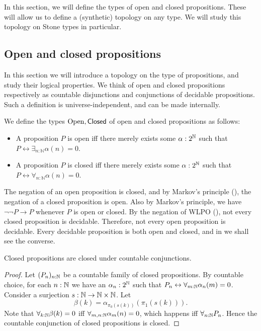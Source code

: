 In this section, we will define the types of open and closed propositions. 
These will allow us to define a (synthetic) topology  \cite{SyntheticTopologyLesnik} on any type.
We will study this topology on Stone types in particular.

\subsection{Open and closed propositions}
In this section we will introduce a topology on the type of propositions, and 
study their logical properties.
We think of open and closed propositions respectively as countable disjunctions and conjunctions of decidable propositions.
Such a definition is universe-independent, and can be made internally.

\begin{definition}
  We define the types $\mathrm{Open}, \mathsf{Closed}$ of open and closed propositions as follows:
  \begin{itemize}
    \item 
    A proposition $P$ is open iff there merely exists some $\alpha:2^{\mathbb{N}}$ such that 
      $P \leftrightarrow \exists_{n:\mathbb N} \alpha(n) = 0$. 
    \item 
    A proposition $P$ is closed iff there merely exists some $\alpha:2^{\mathbb{N}}$ such that 
      $P \leftrightarrow \forall_{n:\mathbb N} \alpha(n) = 0$. 
  \end{itemize}
\end{definition}

\begin{remark}\label{rmkOpenClosedNegation}
  The negation of an open proposition is closed, 
  and by Markov's principle (), the negation of a closed proposition is open. 
  Also by Markov's principle, we have $\neg \neg P \to P$ whenever $P$ is open or closed. 
  By the negation of WLPO (), 
  not every closed proposition is decidable. 
  Therefore, not every open proposition is decidable. 
  Every decidable proposition is both open and closed, 
  and in  we shall see the converse. 
\end{remark}

\begin{lemma}\label{ClosedCountableConjunction}
  Closed propositions are closed under countable conjunctions.
\end{lemma}
\begin{proof}
  Let $(P_n)_{n:\mathbb{N}}$ be a countable family of closed propositions. 
  By countable choice, for each 
  $n:\mathbb{N}$ we have an $\alpha_n:2^{\mathbb{N}} $ 
  such that $P_n \leftrightarrow \forall_{m:\mathbb{N}} \alpha_n(m)  =0$. 
  Consider a surjection $s:\mathbb{N} \to \mathbb{N} \times \mathbb{N}$.
  Let 
  $$\beta(k) = \alpha_{\pi_0(s(k))}(\pi_1 (s(k))).$$
  Note that $\forall_{k:\mathbb{N}} \beta(k) = 0$ iff 
  $\forall_{m,n:\mathbb{N}}\alpha_m(n) = 0$, which happens iff $\forall_{n:\mathbb{N}} P_n$. 
  Hence the countable conjunction of closed propositions is closed. 
\end{proof} 

